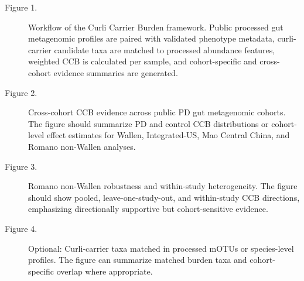 \begin{description}
\item[Figure 1.] Workflow of the Curli Carrier Burden framework. Public processed gut metagenomic profiles are paired with validated phenotype metadata, curli-carrier candidate taxa are matched to processed abundance features, weighted CCB is calculated per sample, and cohort-specific and cross-cohort evidence summaries are generated.
\item[Figure 2.] Cross-cohort CCB evidence across public PD gut metagenomic cohorts. The figure should summarize PD and control CCB distributions or cohort-level effect estimates for Wallen, Integrated-US, Mao Central China, and Romano non-Wallen analyses.
\item[Figure 3.] Romano non-Wallen robustness and within-study heterogeneity. The figure should show pooled, leave-one-study-out, and within-study CCB directions, emphasizing directionally supportive but cohort-sensitive evidence.
\item[Figure 4.] Optional: Curli-carrier taxa matched in processed mOTUs or species-level profiles. The figure can summarize matched burden taxa and cohort-specific overlap where appropriate.
\end{description}
